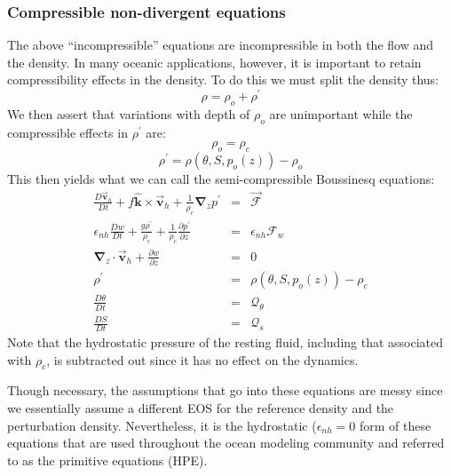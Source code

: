 \subsubsection{Compressible non-divergent equations}

The above ``incompressible'' equations are incompressible in both the flow
and the density. In many oceanic applications, however, it is important to
retain compressibility effects in the density. To do this we must split the
density thus: 
\begin{equation*}
\rho =\rho _{o}+\rho ^{\prime }
\end{equation*}
We then assert that variations with depth of $\rho _{o}$ are unimportant
while the compressible effects in $\rho ^{\prime }$ are: 
\begin{equation*}
\rho _{o}=\rho _{c}
\end{equation*}
\begin{equation*}
\rho ^{\prime }=\rho (\theta ,S,p_{o}(z))-\rho _{o}
\end{equation*}
This then yields what we can call the semi-compressible Boussinesq
equations: 
\begin{eqnarray}
\frac{D\vec{\mathbf{v}}_{h}}{Dt}+f\hat{\mathbf{k}}\times \vec{\mathbf{v}}
_{h}+\frac{1}{\rho _{c}}\mathbf{\nabla }_{z}p^{\prime } &=&\vec{\mathbf{
\mathcal{F}}}  \label{eq:ocean-mom} \\
\epsilon _{nh}\frac{Dw}{Dt}+\frac{g\rho ^{\prime }}{\rho _{c}}+\frac{1}{\rho
_{c}}\frac{\partial p^{\prime }}{\partial z} &=&\epsilon _{nh}\mathcal{F}_{w}
\label{eq:ocean-wmom} \\
\mathbf{\nabla }_{z}\cdot \vec{\mathbf{v}}_{h}+\frac{\partial w}{\partial z}
&=&0  \label{eq:ocean-cont} \\
\rho ^{\prime } &=&\rho (\theta ,S,p_{o}(z))-\rho _{c}  \label{eq:ocean-eos}
\\
\frac{D\theta }{Dt} &=&\mathcal{Q}_{\theta }  \label{eq:ocean-theta} \\
\frac{DS}{Dt} &=&\mathcal{Q}_{s}  \label{eq:ocean-salt}
\end{eqnarray}
Note that the hydrostatic pressure of the resting fluid, including that
associated with $\rho _{c}$, is subtracted out since it has no effect on the
dynamics.

Though necessary, the assumptions that go into these equations are messy
since we essentially assume a different EOS for the reference density and
the perturbation density. Nevertheless, it is the hydrostatic ($\epsilon
_{nh}=0$ form of these equations that are used throughout the ocean modeling
community and referred to as the primitive equations (HPE).


